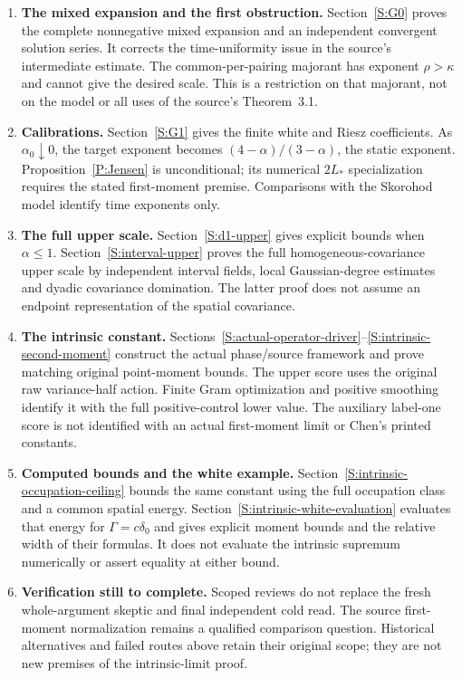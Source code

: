 \documentclass[12pt]{article}
\numberwithin{equation}{section}
\theoremstyle{definition}
\begin{document}
\begin{enumerate}[1.]
  \item \textbf{The mixed expansion and the first obstruction.}
    Section~\ref{S:G0} proves the complete nonnegative mixed expansion
    and an independent convergent solution series. It corrects the
    time-uniformity issue in the source's intermediate estimate.
    The common-per-pairing majorant has exponent $\rho>\kappa$ and cannot
    give the desired scale. This is a restriction on that majorant,
    not on the model or all uses of the source's Theorem~3.1.
  \item \textbf{Calibrations.}
    Section~\ref{S:G1} gives the finite white and Riesz coefficients.
    As $\alpha_0\downarrow0$, the target exponent becomes
    $(4-\alpha)/(3-\alpha)$, the static exponent.
    Proposition~\ref{P:Jensen} is unconditional; its numerical
    $2L_*$ specialization requires the stated first-moment premise.
    Comparisons with the Skorohod model identify time exponents only.
  \item \textbf{The full upper scale.}
    Section~\ref{S:d1-upper} gives explicit bounds when $\alpha\le1$.
    Section~\ref{S:interval-upper} proves the full homogeneous-covariance
    upper scale by independent interval fields, local Gaussian-degree
    estimates and dyadic covariance domination. The latter proof does
    not assume an endpoint representation of the spatial covariance.
  \item \textbf{The intrinsic constant.}
    Sections~\ref{S:actual-operator-driver}--\ref{S:intrinsic-second-moment}
    construct the actual phase/source framework and prove matching
    original point-moment bounds. The upper score uses the original raw
    variance-half action. Finite Gram optimization and positive smoothing
    identify it with the full positive-control lower value.
    The auxiliary label-one score is not identified with an actual
    first-moment limit or Chen's printed constants.
  \item \textbf{Computed bounds and the white example.}
    Section~\ref{S:intrinsic-occupation-ceiling} bounds the same constant
    using the full occupation class and a common spatial energy.
    Section~\ref{S:intrinsic-white-evaluation} evaluates that energy for
    $\Gamma=c\delta_0$ and gives explicit moment bounds and the relative
    width of their formulas. It does not evaluate the intrinsic supremum
    numerically or assert equality at either bound.
  \item \textbf{Verification still to complete.}
    Scoped reviews do not replace the fresh whole-argument skeptic and
    final independent cold read. The source first-moment normalization
    remains a qualified comparison question. Historical alternatives and
    failed routes above retain their original scope; they are not new
    premises of the intrinsic-limit proof.
\end{enumerate}


\end{document}
